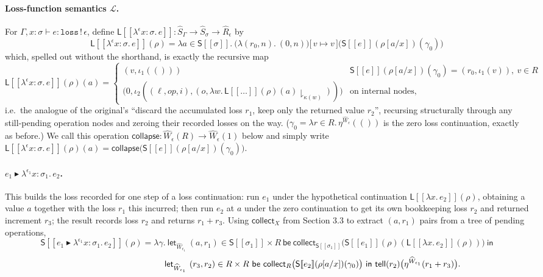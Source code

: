 \documentclass[11pt]{article}
\theoremstyle{plain}
\newcommand{\Ssem}[1]{\mathsf{S}[\![#1]\!]}
\newcommand{\Lsem}[1]{\mathsf{L}[\![#1]\!]}
\newcommand{\Rm}[1]{\widehat{R}_{#1}}
\newcommand{\Sm}[1]{\widehat{S}_{#1}}
\newcommand{\eps}{\epsilon}
\newcommand{\op}{\mathit{op}}
\newcommand{\then}{\mathrel{\blacktriangleright}}
\newcommand{\tell}{\mathsf{tell}}
\begin{document}
\paragraph{Loss-function semantics $\mathcal L$.} For $\Gamma,x\!:\!\sigma\vdash e:\mathtt{loss}\,!\,\eps$,
define $\Lsem{\lambda^\eps x\!:\!\sigma.\,e} : \Sm\Gamma \to \Sm\sigma \to \Rm\eps$ by
\[
  \Lsem{\lambda^\eps x\!:\!\sigma.\,e}(\rho) = \lambda a\in\Ssem\sigma.\
     \big(\lambda(r_0,n).\ (0,n)\big)\Big[\, v \mapsto v \,\Big]\big(\Ssem{e}(\rho[a/x])(\gamma_0)\big)
\]
which, spelled out without the shorthand, is exactly the recursive map
\[
  \Lsem{\lambda^\eps x\!:\!\sigma.\,e}(\rho)(a) =
  \begin{cases}
    (v,\iota_1(())) & \Ssem{e}(\rho[a/x])(\gamma_0) = (r_0,\iota_1(v)),\ v\in R\\
    \big(0,\iota_2((\ell,\op,i),(o,\lambda w.\,\Lsem{\dots}(\rho)(a)\!\downharpoonright_{\kappa(w)}))\big) & \text{on internal nodes},
  \end{cases}
\]
i.e.\ the analogue of the original's ``discard the accumulated loss $r_1$, keep only the
returned value $r_2$'', recursing structurally through any still-pending operation nodes and
zeroing their recorded losses on the way. ($\gamma_0 = \lambda r{\in}R.\,\eta^{\widehat
W_\eps}(())$ is the zero loss continuation, exactly as before.) We call this operation
$\mathsf{collapse}: \widehat W_\eps(R)\to\widehat W_\eps(1)$ below and simply write
$\Lsem{\lambda^\eps x\!:\!\sigma.\,e}(\rho)(a) = \mathsf{collapse}\big(\Ssem e(\rho[a/x])(\gamma_0)\big)$.

\paragraph{$e_1\then\lambda^{\eps_1} x\!:\!\sigma_1.\,e_2$.} This builds the loss recorded for
one step of a loss continuation: run $e_1$ under the hypothetical continuation
$\Lsem{\lambda x.\,e_2}(\rho)$, obtaining a value $a$ together with the loss $r_1$ this
incurred; then run $e_2$ at $a$ under the zero continuation to get its own bookkeeping loss
$r_2$ and returned increment $r_3$; the result records loss $r_2$ and returns $r_1+r_3$. Using
$\mathsf{collect}_X$ from Section 3.3 to extract $(a,r_1)$ pairs from a tree of pending
operations,
\[
  \Ssem{e_1\then\lambda^{\eps_1}x\!:\!\sigma_1.\,e_2}(\rho) = \lambda\gamma.\
    \mathsf{let}_{\widehat W_{\eps_1}}\ (a,r_1)\in\Ssem{\sigma_1}\times R\ \mathsf{be}\
      \mathsf{collect}_{\Ssem{\sigma_1}}\big(\Ssem{e_1}(\rho)(\Lsem{\lambda x.\,e_2}(\rho))\big)\ \mathsf{in}
\]
\[
  \hphantom{\Ssem{e_1\then\lambda^{\eps_1}x\!:\!\sigma_1.\,e_2}(\rho) = }
    \mathsf{let}_{\widehat W_{\eps_1}}\ (r_3,r_2)\in R\times R\ \mathsf{be}\
      \mathsf{collect}_R\big(\Ssem{e_2}(\rho[a/x])(\gamma_0)\big)\ \mathsf{in}\
      \tell(r_2)\big(\eta^{\widehat W_{\eps_1}}(r_1+r_3)\big).
\]
\end{document}
